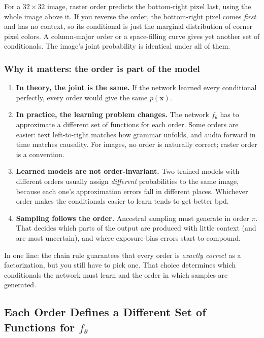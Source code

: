 For a $32\times32$ image, raster order predicts the bottom-right pixel last, using the whole image above it. If you reverse the order, the bottom-right pixel comes \emph{first} and has no context, so its conditional is just the marginal distribution of corner pixel colors. A column-major order or a space-filling curve gives yet another set of conditionals. The image's joint probability is identical under all of them.

\subsubsection*{Why it matters: the order is part of the model}

\begin{enumerate}
  \item \textbf{In theory, the joint is the same.} If the network learned every conditional perfectly, every order would give the same $p(\mathbf{x})$.
  \item \textbf{In practice, the learning problem changes.} The network $f_\theta$ has to approximate a different set of functions for each order. Some orders are easier: text left-to-right matches how grammar unfolds, and audio forward in time matches causality. For images, no order is naturally correct; raster order is a convention.
  \item \textbf{Learned models are not order-invariant.} Two trained models with different orders usually assign \emph{different} probabilities to the same image, because each one's approximation errors fall in different places. Whichever order makes the conditionals easier to learn tends to get better bpd.
  \item \textbf{Sampling follows the order.} Ancestral sampling must generate in order $\pi$. That decides which parts of the output are produced with little context (and are most uncertain), and where exposure-bias errors start to compound.
\end{enumerate}

In one line: the chain rule guarantees that every order is \emph{exactly correct} as a factorization, but you still have to pick one. That choice determines which conditionals the network must learn and the order in which samples are generated.

\subsection*{Each Order Defines a Different Set of Functions for $f_\theta$}

